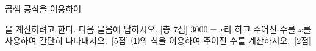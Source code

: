 곱셈 공식을 이용하여\par\smallskip{}\par\smallskip\noindent 을 계산하려고 한다. 다음 물음에 답하시오. [총 7점]
 $3000=x$라 하고 주어진 수를 $x$를 사용하여 간단히 나타내시오.~\mbox{\mbox{[5점]}}
 ⑴의 식을 이용하여 주어진 수를 계산하시오.~\mbox{\mbox{[2점]}}

